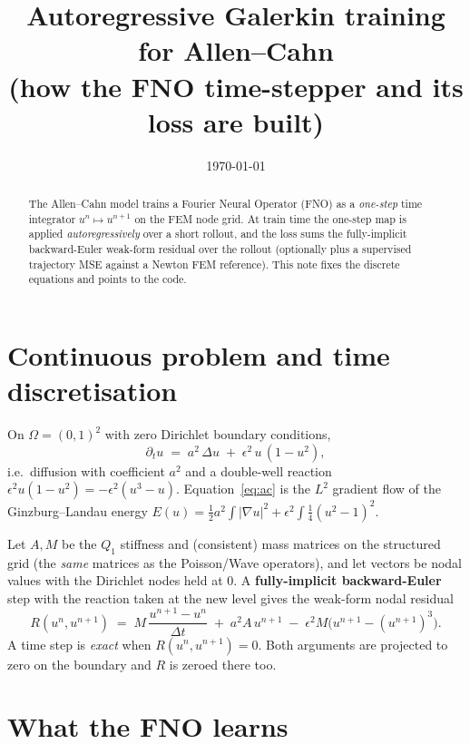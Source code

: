 \documentclass[11pt]{article}
\title{Autoregressive Galerkin training for Allen--Cahn\\
\large (how the FNO time-stepper and its loss are built)}
\author{}
\date{\today}
\newcommand{\dt}{\Delta t}
\begin{document}
\maketitle

\begin{abstract}
The Allen--Cahn model trains a Fourier Neural Operator (FNO) as a \emph{one-step} time
integrator $u^{n}\mapsto u^{n+1}$ on the FEM node grid. At train time the one-step map is
applied \emph{autoregressively} over a short rollout, and the loss sums the fully-implicit
backward-Euler weak-form residual over the rollout (optionally plus a supervised trajectory
MSE against a Newton FEM reference). This note fixes the discrete equations and points to the
code.
\end{abstract}

\section{Continuous problem and time discretisation}

On $\Omega=(0,1)^2$ with zero Dirichlet boundary conditions,
\begin{equation}
  \partial_t u \;=\; a^2\,\Delta u \;+\; \epsilon^2\, u\,(1-u^2),
  \label{eq:ac}
\end{equation}
i.e.\ diffusion with coefficient $a^2$ and a double-well reaction $\epsilon^2 u(1-u^2)
= -\epsilon^2(u^3-u)$. Equation~\eqref{eq:ac} is the $L^2$ gradient flow of the
Ginzburg--Landau energy $E(u)=\tfrac12 a^2\!\int|\nabla u|^2 + \epsilon^2\!\int \tfrac14(u^2-1)^2$.

Let $A,M$ be the $Q_1$ stiffness and (consistent) mass matrices on the structured grid
(the \emph{same} matrices as the Poisson/Wave operators), and let vectors be nodal values with
the Dirichlet nodes held at $0$. A \textbf{fully-implicit backward-Euler} step with the reaction
taken at the new level gives the weak-form nodal residual
\begin{equation}
  \boxed{\;
  R(u^{n},u^{n+1}) \;=\; M\,\frac{u^{n+1}-u^{n}}{\dt}
     \;+\; a^2 A\,u^{n+1}
     \;-\; \epsilon^2 M\big(u^{n+1}-(u^{n+1})^3\big).
  \;}
  \label{eq:res}
\end{equation}
A time step is \emph{exact} when $R(u^n,u^{n+1})=0$. Both arguments are projected to zero on
the boundary and $R$ is zeroed there too.

\section{What the FNO learns}
\end{document}
